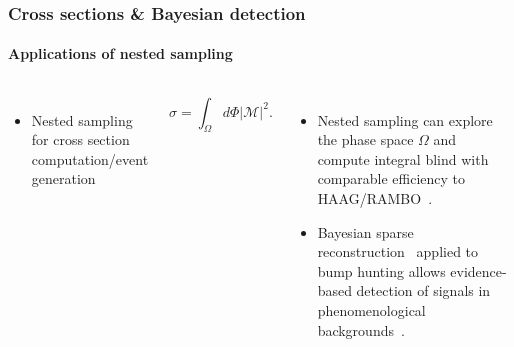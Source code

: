 \documentclass[aspectratio=169]{beamer}
\begin{document}
\begin{frame}
    \frametitle{Cross sections \& Bayesian detection}
    \framesubtitle{Applications of nested sampling}
    \begin{columns}
        \begin{columns}
            \begin{itemize}
                \item Nested sampling for cross section computation/event generation
            \end{itemize}
            \[\sigma = \int_\Omega d\Phi |\mathcal{M}|^2.\]
        \end{columns}
        \begin{itemize}
            \item Nested sampling can explore the phase space $\Omega$ and compute integral blind with comparable efficiency to HAAG/RAMBO~.
            \item Bayesian sparse reconstruction~ applied to bump hunting allows evidence-based detection of signals in phenomenological backgrounds~.
        \end{itemize}

\end{columns}
\end{frame}
\end{document}
